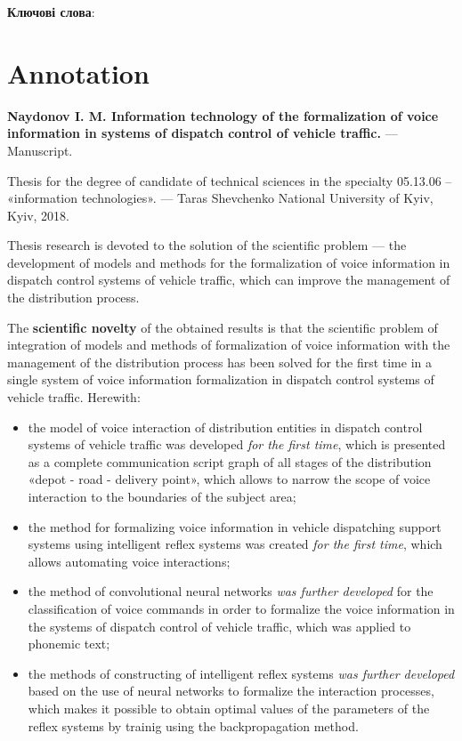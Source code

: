 \textbf{Ключові слова}: \keywords

\chapter*{Annotation}

\textbf{Naydonov I. M. Information technology of the formalization of voice information in systems of dispatch control of vehicle traffic.} --- Manuscript.

Thesis for the degree of candidate of technical sciences in the specialty 05.13.06 -- «information technologies». --- Taras Shevchenko National University of Kyiv, Kyiv, 2018.

Thesis research is devoted to the solution of the scientific problem --- the development of models and methods for the formalization of voice information in dispatch control systems of vehicle traffic, which can improve the management of the distribution process.

The \textbf{scientific novelty} of the obtained results is that the scientific problem of integration of models and methods of formalization of voice information with the management of the distribution process has been solved for the first time in a single system of voice information formalization in dispatch control systems of vehicle traffic. Herewith: 

\begin{itemize}
	\item the model of voice interaction of distribution entities in dispatch control systems of vehicle traffic was developed \textit{for the first time}, which is presented as a complete communication script graph of all stages of the distribution «depot - road - delivery point», which allows to narrow the scope of voice interaction to the boundaries of the subject area; 
	\item the method for formalizing voice information in vehicle dispatching support systems using intelligent reflex systems was created \textit{for the first time}, which allows automating voice interactions; 
	\item the method of convolutional neural networks \textit{was further developed} for the classification of voice commands in order to formalize the voice information in the systems of dispatch control of vehicle traffic, which was applied to phonemic text; 
	\item the methods of constructing of intelligent reflex systems \textit{was further developed} based on the use of neural networks to formalize the interaction processes, which makes it possible to obtain optimal values ​​of the parameters of the reflex systems by trainig using the backpropagation method.
\end{itemize}

